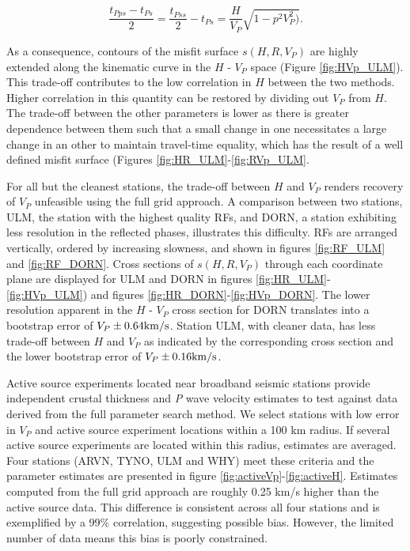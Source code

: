 \documentclass[draft, 12pt]{article}
\begin{document}
$$\frac{t_{Pps}-t_{Ps}}{2}=\frac{t_{Pss}}{2} - t_{Ps}= \frac{H}{V_P}\sqrt{1-p^2V^2_P)}.$$

\noindent As a consequence, contours of the misfit surface $s(H,R,V_P)$ are highly extended along the kinematic curve in the $H$ - $V_P$ space (Figure \ref{fig:HVp_ULM}). This trade-off contributes to the low correlation in $H$ between the two methods. Higher correlation in this quantity can be restored by dividing out $V_P$ from $H$. The trade-off between the other parameters is lower as there is greater dependence between them such that a small change in one necessitates a large change in an other to maintain travel-time equality, which has the result of a well defined misfit surface (Figures \ref{fig:HR_ULM}-\ref{fig:RVp_ULM}.

For all but the cleanest stations, the trade-off between $H$ and $V_P$ renders recovery of $V_P$ unfeasible using the full grid approach. A comparison between two stations, ULM, the station with the highest quality RFs, and DORN, a station exhibiting less resolution in the reflected phases, illustrates this difficulty. RFs are arranged vertically, ordered by increasing slowness, and shown in figures \ref{fig:RF_ULM} and \ref{fig:RF_DORN}. Cross sections of $s(H,R,V_P)$ through each coordinate plane are displayed for ULM and DORN in figures \ref{fig:HR_ULM}-\ref{fig:HVp_ULM}) and figures \ref{fig:HR_DORN}-\ref{fig:HVp_DORN}. The lower resolution apparent in the $H$ - $V_P$ cross section for DORN translates into a bootstrap error of $V_P \pm 0.64 {\rm km/s}$. Station ULM, with cleaner data, has less trade-off between $H$ and $V_P$ as indicated by the corresponding cross section and the lower bootstrap error of $V_P \pm 0.16 {\rm km/s}$.

Active source experiments located near broadband seismic stations provide independent crustal thickness and {\it P} wave velocity estimates to test against data derived from the full parameter search method. We select stations with low error in $V_P$ and active source experiment locations within a 100 km radius. If several active source experiments are located within this radius, estimates are averaged. Four stations (ARVN, TYNO, ULM and WHY) meet these criteria and the parameter estimates are presented in figure \ref{fig:activeVp}-\ref{fig:activeH}. Estimates computed from the full grid approach are roughly 0.25 km/s higher than the active source data. This difference is consistent across all four stations and is exemplified by a 99\% correlation, suggesting possible bias. However, the limited number of data means this bias is poorly constrained.
\end{document}
